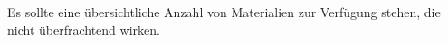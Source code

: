 Es sollte eine übersichtliche Anzahl von Materialien zur Verfügung stehen, die nicht überfrachtend wirken.
